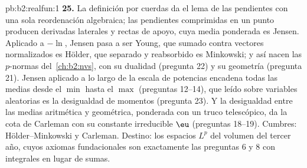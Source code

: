 \begin{solution}{pb:b2:realfun:1}
\textbf{25.} La definición por cuerdas da el lema de las
pendientes con una sola reordenación algebraica; las pendientes
comprimidas en un punto producen derivadas laterales y rectas de
apoyo, cuya media ponderada es Jensen. Aplicado a $-\ln$, Jensen
pasa a ser Young, que sumado contra vectores normalizados es
Hölder, que separado y reabsorbido es Minkowski; y así nacen las
$p$-normas del~\cref{ch:b2:nvs}, con su dualidad (pregunta 22) y
su geometría (pregunta 21). Jensen aplicado a lo largo de la
escala de potencias encadena todas las medias desde el $\min$
hasta el $\max$ (preguntas 12--14), que leído sobre variables
aleatorias es la desigualdad de momentos (pregunta 23). Y la
desigualdad entre las medias aritmética y geométrica, ponderada
con un truco telescópico, da la cota de Carleman con su constante
irreducible $\eu$ (preguntas 18--19). Cumbres:
Hölder--Minkowski y Carleman. Destino: los espacios $L^p$ del
volumen del tercer año, cuyos axiomas fundacionales son
exactamente las preguntas 6 y 8 con integrales en lugar de sumas.
\end{solution}
